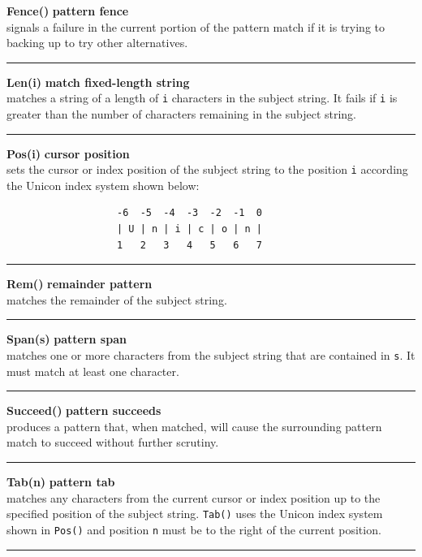 \documentclass[letterpaper,12pt]{article}
\begin{document}
\noindent\textbf{Fence()} \hfill\textbf{pattern fence}\\
signals a failure in the current portion of the pattern match
if it is trying to backing up to try other alternatives.\\
\noindent\rule{16.5cm}{0.1pt}

\noindent\textbf{Len(i)} \hfill\textbf{match fixed-length string}\\
matches a string of a length of \texttt{i} characters in the subject string.
It fails if \texttt{i} is greater than the number of characters remaining
in the subject string.\\
\noindent\rule{16.5cm}{0.1pt}

\noindent\textbf{Pos(i)} \hfill\textbf{cursor position}\\
sets the cursor or index position of the subject string to
the position \texttt{i} according the Unicon index system shown below:
\begin{verbatim}
                   -6  -5  -4  -3  -2  -1  0
                   | U | n | i | c | o | n |
                   1   2   3   4   5   6   7
\end{verbatim}
\noindent\rule{16.5cm}{0.1pt}

\noindent\textbf{Rem()} \hfill\textbf{remainder pattern}\\
matches the remainder of the subject string.\\
\noindent\rule{16.5cm}{0.1pt}

\noindent\textbf{Span(s)} \hfill\textbf{pattern span}\\
matches one or more characters from the subject string that
are contained in \texttt{s}.  It must match at least one character.\\
\noindent\rule{16.5cm}{0.1pt}

\noindent\textbf{Succeed()} \hfill\textbf{pattern succeeds}\\
produces a pattern that, when matched, will cause the surrounding
pattern match to succeed without further scrutiny.\\
\noindent\rule{16.5cm}{0.1pt}

\noindent\textbf{Tab(n)} \hfill\textbf{pattern tab}\\
matches any characters from the current cursor or index position up to
the specified position of the subject string.  \texttt{Tab()} uses the
Unicon index system shown in \texttt{Pos()} and position \texttt{n} must
be to the right of the current position.\\
\noindent\rule{16.5cm}{0.1pt}
\end{document}
